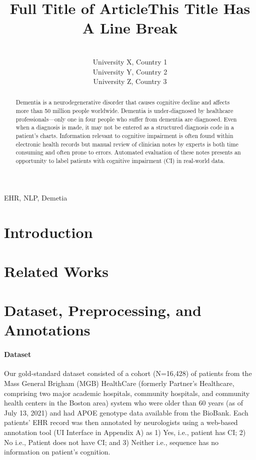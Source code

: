 \documentclass[pmlr,twocolumn,10pt]{jmlr} %
\title[Short Title]{Full Title of Article\titlebreak This Title Has
A Line Break}
\author{%
\Name{First Author 1}\equal{These authors contributed equally} \Email{abc@sample.com}\\
\addr University X, Country 1
\AND
\Name{First Author 2}\footnotemark[1] \Email{def@sample.com}\\
\addr University Y, Country 2
\AND
\Name{Last Author} \Email{ghi@sample.com}\\
\addr University Z, Country 3
}
\begin{document}
\maketitle

\begin{abstract}
\tab Dementia is a neurodegenerative disorder that causes cognitive decline and affects more than 50 million people worldwide. Dementia is under-diagnosed by healthcare professionals—only one in four people who suffer from dementia are diagnosed. Even when a diagnosis is made, it may not be entered as a structured diagnosis code in a patient’s charts.  Information relevant to cognitive impairment is often found within electronic health records but manual review of clinician notes by experts is both time consuming and often prone to errors. Automated evaluation of these notes presents an opportunity to label patients with cognitive impairment (CI) in real-world data. 
\end{abstract}
\begin{keywords}
EHR, NLP, Demetia
\end{keywords}

\section{Introduction}
\label{sec:intro}

\section{Related Works}
\label{sec:RelatedWorks}

\section{Dataset, Preprocessing, and Annotations}

\paragraph{Dataset}
\label{sec:Dataset} Our gold-standard dataset consisted of a cohort (N=16,428) of patients from the Mass General Brigham (MGB) HealthCare (formerly Partner's Healthcare, comprising two major academic hospitals, community hospitals, and community health centers in the Boston area) system who were older than 60 years (as of July 13, 2021) and had APOE genotype data available from the BioBank. Each patients' EHR record was then annotated by neurologists using a web-based annotation tool (UI Interface in Appendix A) as 1) Yes, i.e., patient has CI; 2) No i.e., Patient does not have CI; and 3) Neither i.e., sequence has no information on patient’s cognition.
\end{document}
